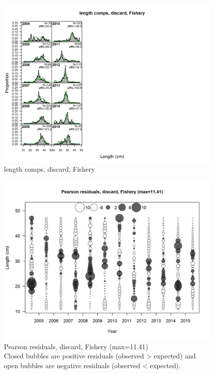 \documentclass[12pt,]{article}
\begin{document}
\FloatBarrier

\FloatBarrier

\FloatBarrier

\FloatBarrier

\FloatBarrier

\FloatBarrier

\begin{figure}
\centering
\includegraphics{./r4ss/plots_mod1/comp_lenfit_flt1mkt1.png}
\caption{length comps, discard, Fishery
\label{fig:mod1_1_comp_lenfit_flt1mkt1}}
\end{figure}

\begin{figure}
\centering
\includegraphics{./r4ss/plots_mod1/comp_lenfit_residsflt1mkt1.png}
\caption{Pearson residuals, discard, Fishery (max=11.41)\\
Closed bubbles are positive residuals (observed \textgreater{} expected)
and open bubbles are negative residuals (observed \textless{} expected).
\label{fig:mod1_2_comp_lenfit_residsflt1mkt1}}
\end{figure}
\end{document}
